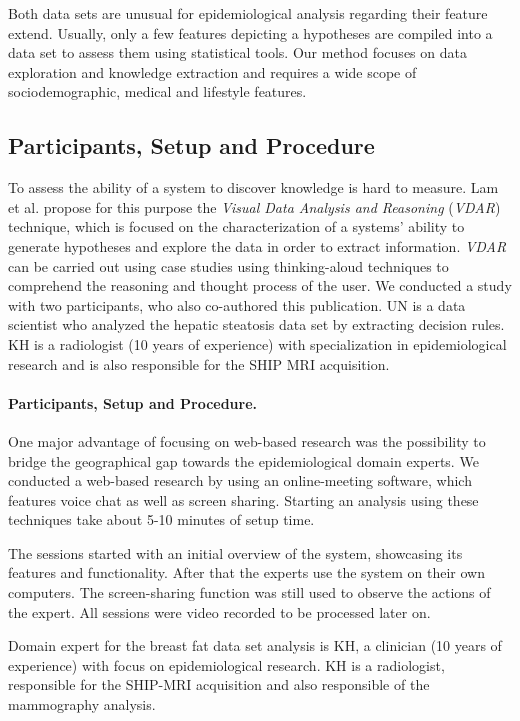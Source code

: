 \documentclass[journal]{style/vgtc} 			          %
\begin{document}
Both data sets are unusual for epidemiological analysis regarding their feature extend.
Usually, only a few features depicting a hypotheses are compiled into a data set to assess them using statistical tools.
Our method focuses on data exploration and knowledge extraction and requires a wide scope of sociodemographic, medical and lifestyle features.
\subsection{Participants, Setup and Procedure}
To assess the ability of a system to discover knowledge is hard to measure.
Lam et al. \cite{Lam2012} propose for this purpose the \emph{Visual Data Analysis and Reasoning} (\emph{VDAR}) technique, which is focused on the characterization of a systems' ability to generate hypotheses and explore the data in order to extract information.
\emph{VDAR} can be carried out using case studies using thinking-aloud techniques to comprehend the reasoning and thought process of the user.
We conducted a study with two participants, who also co-authored this publication.
UN is a data scientist who analyzed the hepatic steatosis data set by extracting decision rules.
KH is a radiologist (10 years of experience) with specialization in epidemiological research and is also responsible for the SHIP MRI acquisition.
\paragraph{Participants, Setup and Procedure.}
One major advantage of focusing on web-based research was the possibility to bridge the geographical gap towards the epidemiological domain experts.
We conducted a web-based research by using an online-meeting software, which features voice chat as well as screen sharing.
Starting an analysis using these techniques take about 5-10 minutes of setup time.

The sessions started with an initial overview of the system, showcasing its features and functionality.
After that the experts use the system on their own computers.
The screen-sharing function was still used to observe the actions of the expert.
All sessions were video recorded to be processed later on.

Domain expert for the breast fat data set analysis is KH, a clinician (10 years of experience) with focus on epidemiological research.
KH is a radiologist, responsible for the SHIP-MRI acquisition and also responsible of the mammography analysis.
\end{document}
